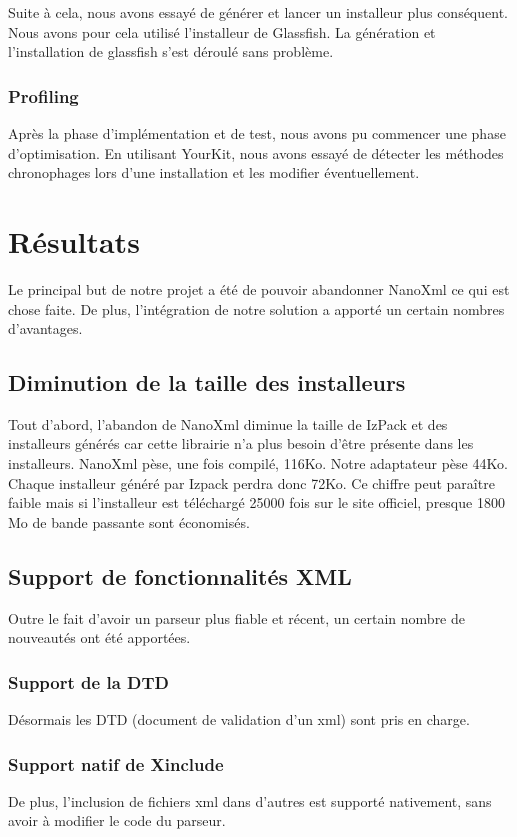Suite à cela, nous avons essayé de générer et lancer un installeur plus conséquent.
Nous avons pour cela utilisé l'installeur de Glassfish.
La génération et l'installation de glassfish s'est déroulé sans problème.
\subsubsection{Profiling}
Après la phase d'implémentation et de test, nous avons pu commencer une phase d'optimisation.
En utilisant YourKit, nous avons essayé de détecter les méthodes chronophages lors d'une installation et les modifier éventuellement.

\section{Résultats}
Le principal but de notre projet a été de pouvoir abandonner NanoXml ce qui est chose faite.
De plus, l'intégration de notre solution a apporté un certain nombres d'avantages.

\subsection{Diminution de la taille des installeurs}
Tout d'abord, l'abandon de NanoXml diminue la taille de IzPack et des installeurs générés car cette librairie n'a plus besoin d'être présente dans les installeurs.
NanoXml pèse, une fois compilé, 116Ko.
Notre adaptateur pèse 44Ko.
Chaque installeur généré par Izpack perdra donc 72Ko.
Ce chiffre peut paraître faible mais si l'installeur est téléchargé 25000 fois sur le site officiel, presque 1800 Mo de bande passante sont économisés.
\subsection{Support de fonctionnalités XML}
Outre le fait d'avoir un parseur plus fiable et récent, un certain nombre de nouveautés ont été apportées.
\subsubsection{Support de la DTD}
Désormais les DTD (document de validation d'un xml) sont pris en charge.
\subsubsection{Support natif de Xinclude}
De plus, l'inclusion de fichiers xml dans d'autres est supporté nativement, sans avoir à modifier le code du parseur.

